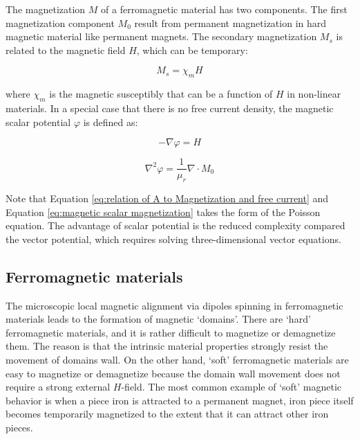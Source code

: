         
        The magnetization $M$ of a ferromagnetic material has two components. The first magnetization component $M_0$ result from permanent magnetization in hard magnetic material like permanent magnets. The secondary magnetization $M_s$ is related to the magnetic field $H$, which can be temporary:
        
        
        \begin{equation}
            M_s = \chi_m H
            \label{eq:secondary magnetization}
        \end{equation}     
        
        
        where $\chi_m$ is the magnetic susceptibly that can be a function of $H$ in non-linear materials. In a special case that there is no free current density, the magnetic scalar potential $\varphi$ is defined as:
        
        
        \begin{equation}
            - \nabla \varphi = H
            \label{eq:magnetic scalar and vector potential}
        \end{equation}     
        
        \begin{equation}
            \nabla^2 \varphi = \frac{1}{\mu_r} \nabla \cdot M_0
            \label{eq:magnetic scalar magnetization}
        \end{equation}     
        
        
        Note that Equation \ref{eq:relation of A to Magnetization and free current} and Equation \ref{eq:magnetic scalar magnetization} takes the form of the Poisson equation. The advantage of scalar potential is the reduced complexity compared the vector potential, which requires solving three-dimensional vector equations.
        
        
    \subsection{Ferromagnetic materials}                \label{Chapter:background/electromagnetic field theory/ferromagnetic material theory}
    
    
        The microscopic local magnetic alignment via dipoles spinning in ferromagnetic materials leads to the formation of magnetic ‘domains’. There are ‘hard’ ferromagnetic materials, and it is rather difficult to magnetize or demagnetize them. The reason is that the intrinsic material properties strongly resist the movement of domains wall. On the other hand, ‘soft’ ferromagnetic materials are easy to magnetize or demagnetize because the domain wall movement does not require a strong external $H$-field. The most common example of ‘soft’ magnetic behavior is when a piece iron is attracted to a permanent magnet, iron piece itself becomes temporarily magnetized to the extent that it can attract other iron pieces. 
        
